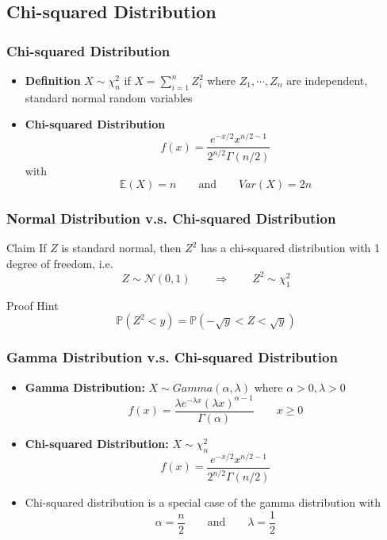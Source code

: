 \documentclass[serif,mathserif,professionalfont]{beamer}
\begin{document}
\subsection{Chi-squared Distribution}


\begin{frame}
	
	\frametitle{Chi-squared Distribution}
	
	\begin{itemize}
		\item \textbf{Definition} \newline
		$ X \sim \chi^2_n $ if $ X = \sum_{i=1}^{n} Z_i^2 $ where $ Z_1, \cdots, Z_n $ are independent, standard normal random variables
		\item \textbf{Chi-squared Distribution} 
		$$ f(x) = \frac{e^{-x/2} x^{n/2-1}}{2^{n/2} \Gamma(n/2)} $$
		with
		$$ \mathbb{E}(X) = n \qquad \text{and} \qquad Var(X) = 2n $$
	\end{itemize}
	
\end{frame}



\begin{frame}
	
	\frametitle{Normal Distribution v.s. Chi-squared Distribution}
	
	\begin{block}{Claim}
		If $ Z $ is standard normal, then $ Z^2 $ has a chi-squared distribution with 1 degree of freedom, i.e.
		$$ Z \sim \mathcal{N}(0,1) \qquad \Longrightarrow \qquad Z^2 \sim \chi^2_1 $$
	\end{block}

    \begin{block}{Proof Hint}
    	$$ \mathbb{P}(Z^2 < y) = \mathbb{P}( -\sqrt{y} < Z < \sqrt{y})  $$
    \end{block}
	
\end{frame}



\begin{frame}
	
	\frametitle{Gamma Distribution v.s. Chi-squared Distribution}
	
	\begin{itemize}
		\item \textbf{Gamma Distribution:} $ X \sim Gamma(\alpha, \lambda) $ where $ \alpha > 0, \lambda > 0 $
		$$ f(x) = \frac{\lambda e^{-\lambda x} (\lambda x)^{\alpha - 1}}{\Gamma(\alpha)} \qquad x \geq 0 $$
		\item \textbf{Chi-squared Distribution:} $ X \sim \chi^2_n $ 
		$$ f(x) = \frac{e^{-x/2} x^{n/2-1}}{2^{n/2} \Gamma(n/2)} $$
		\item Chi-squared distribution is a special case of the gamma distribution with
		$$ \alpha = \frac{n}{2} \qquad \text{and} \qquad \lambda = \frac{1}{2} $$
	\end{itemize}
	
\end{frame}
\end{document}
